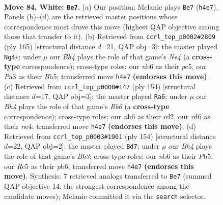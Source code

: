 \documentclass[11pt]{article}
\begin{document}
\clearpage

\begin{figure}[p]\centering
\begin{subfigure}{0.46\textwidth}\centering
\resizebox{\linewidth}{!}{%
\newchessgame
\chessboard[
  setfen={6k1/8/1n1r4/2R5/p4P1B/P6P/6K1/8 w - - 23 84},
  showmover=false,
  pgfstyle=straightmove, color=movearrow, markmove={h4-e7}
]}
\caption{}
\end{subfigure}\hfill
\begin{subfigure}{0.46\textwidth}\centering
\resizebox{\linewidth}{!}{%
\newchessgame
\chessboard[
  setfen={2R5/4k3/4p3/2P1n1pb/B7/4K3/8/8 b - - 2 83},
  showmover=false,
  pgfstyle=straightmove, color=movearrow, markmove={e5-g4}
]}
\caption{}
\end{subfigure}
\\[4pt]
\begin{subfigure}{0.46\textwidth}\centering
\resizebox{\linewidth}{!}{%
\newchessgame
\chessboard[
  setfen={8/4k3/1R6/4B3/2P1n1P1/8/p2r4/6K1 w - - 0 78},
  showmover=false,
  pgfstyle=straightmove, color=movearrow, markmove={b6-a6}
]}
\caption{}
\end{subfigure}\hfill
\begin{subfigure}{0.46\textwidth}\centering
\resizebox{\linewidth}{!}{%
\newchessgame
\chessboard[
  setfen={8/8/1p1n1k2/1P2p3/1K6/5P1B/7P/8 w - - 1 78},
  showmover=false,
  pgfstyle=straightmove, color=movearrow, markmove={h3-d7}
]}
\caption{}
\end{subfigure}
\caption{\textbf{Move 84, White: \texttt{Be7}.} (a) Our position; Melanie plays \texttt{Be7} (\texttt{h4e7}). Panels (b)--(d) are the retrieved master positions whose correspondence most drove this move (highest QAP objective among those that transfer to it). (b) Retrieved from \texttt{ccrl\_top\_p0002\#2809} (ply 165) [structural distance $d$=21, QAP obj=3]: the master played \texttt{Ng4+}; under $\mu$ our \emph{Bh4} plays the role of that game's \emph{Ne4} (a \textbf{cross-type} correspondence); cross-type roles: our \emph{n}b6 as their \emph{p}c5, our \emph{P}a3 as their \emph{B}h5; transferred move \texttt{h4e7} \textbf{(endorses this move)}. (c) Retrieved from \texttt{ccrl\_top\_p0000\#147} (ply 154) [structural distance $d$=17, QAP obj=3]: the master played \texttt{Ra6}; under $\mu$ our \emph{Bh4} plays the role of that game's \emph{Rb6} (a \textbf{cross-type} correspondence); cross-type roles: our \emph{n}b6 as their \emph{r}d2, our \emph{r}d6 as their \emph{n}e4; transferred move \texttt{h4e7} \textbf{(endorses this move)}. (d) Retrieved from \texttt{ccrl\_top\_p0003\#1901} (ply 154) [structural distance $d$=22, QAP obj=2]: the master played \texttt{Bd7}; under $\mu$ our \emph{Bh4} plays the role of that game's \emph{Bh3}; cross-type roles: our \emph{n}b6 as their \emph{P}b5, our \emph{R}c5 as their \emph{p}b6; transferred move \texttt{h4e7} \textbf{(endorses this move)}. Synthesis: 7 retrieved analogs transferred to \texttt{Be7} (summed QAP objective 14, the strongest correspondence among the candidate moves); Melanie committed it via the \texttt{search} selector.}
\label{fig:thought-m166}
\end{figure}
\end{document}
